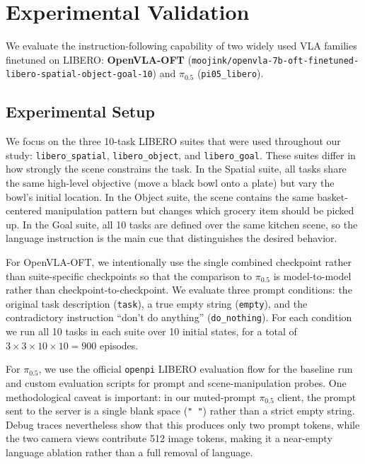 \documentclass{article}
\begin{document}
\section{Experimental Validation}

We evaluate the instruction-following capability of two widely used VLA families finetuned on LIBERO: \textbf{OpenVLA-OFT} (\texttt{moojink/openvla-7b-oft-finetuned-libero-spatial-object-goal-10}) and \textbf{$\pi_{0.5}$} (\texttt{pi05\_libero}).

\subsection{Experimental Setup}

We focus on the three 10-task LIBERO suites that were used throughout our study: \texttt{libero\_spatial}, \texttt{libero\_object}, and \texttt{libero\_goal}. These suites differ in how strongly the scene constrains the task. In the Spatial suite, all tasks share the same high-level objective (move a black bowl onto a plate) but vary the bowl's initial location. In the Object suite, the scene contains the same basket-centered manipulation pattern but changes which grocery item should be picked up. In the Goal suite, all 10 tasks are defined over the same kitchen scene, so the language instruction is the main cue that distinguishes the desired behavior.

For OpenVLA-OFT, we intentionally use the single combined checkpoint rather than suite-specific checkpoints so that the comparison to $\pi_{0.5}$ is model-to-model rather than checkpoint-to-checkpoint. We evaluate three prompt conditions: the original task description (\texttt{task}), a true empty string (\texttt{empty}), and the contradictory instruction ``don't do anything'' (\texttt{do\_nothing}). For each condition we run all 10 tasks in each suite over 10 initial states, for a total of \(3 \times 3 \times 10 \times 10 = 900\) episodes.

For $\pi_{0.5}$, we use the official \texttt{openpi} LIBERO evaluation flow for the baseline run and custom evaluation scripts for prompt and scene-manipulation probes. One methodological caveat is important: in our muted-prompt $\pi_{0.5}$ client, the prompt sent to the server is a single blank space (\texttt{" "}) rather than a strict empty string. Debug traces nevertheless show that this produces only two prompt tokens, while the two camera views contribute 512 image tokens, making it a near-empty language ablation rather than a full removal of language.
\end{document}
